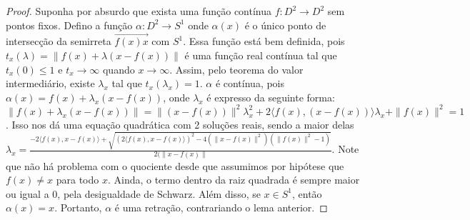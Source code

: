\begin{proof}
    Suponha por absurdo que exista uma função contínua $f:D^2 \longrightarrow D^2$ sem pontos fixos. Defino a função $\alpha: D^2 \longrightarrow S^1$ onde $\alpha(x)$ é o único ponto de intersecção da semirreta $\overrightarrow{f(x)x}$ com $S^1$. Essa função está bem definida, pois $t_x(\lambda) = \|f(x) + \lambda(x - f(x))\|$ é uma função real contínua tal que $t_x(0) \leq 1$ e $t_x \to \infty$ quando $x \to \infty$. Assim, pelo teorema do valor intermediário, existe $\lambda_x$ tal que $t_x(\lambda_x) = 1$. $\alpha$ é contínua, pois $\alpha(x) = f(x) + \lambda_x(x - f(x))$, onde $\lambda_x$ é expresso da seguinte forma:
    $\|f(x) + \lambda_x(x - f(x))\| = \|(x - f(x))\|^2\lambda_x^2 + 2\langle f(x), (x - f(x)) \rangle\lambda_x + \|f(x)\|^2 = 1$. Isso nos dá uma equação quadrática com 2 soluções reais, sendo a maior delas $\lambda_x = \frac{-2\langle f(x), x - f(x)\rangle + \sqrt{(2\langle f(x), x - f(x)\rangle)^2 - 4(\|x - f(x)\|^2)(\|f(x)\|^2 - 1)}}{2(\|x - f(x)\|}$. Note que não há problema com o quociente desde que assumimos por hipótese que $f(x) \ne x$ para todo $x$. Ainda, o termo dentro da raiz quadrada é sempre maior ou igual a 0, pela desigualdade de Schwarz. Além disso, se $x \in S^1$, então $\alpha(x) = x$. Portanto, $\alpha$ é uma retração, contrariando o lema anterior. 
\end{proof}